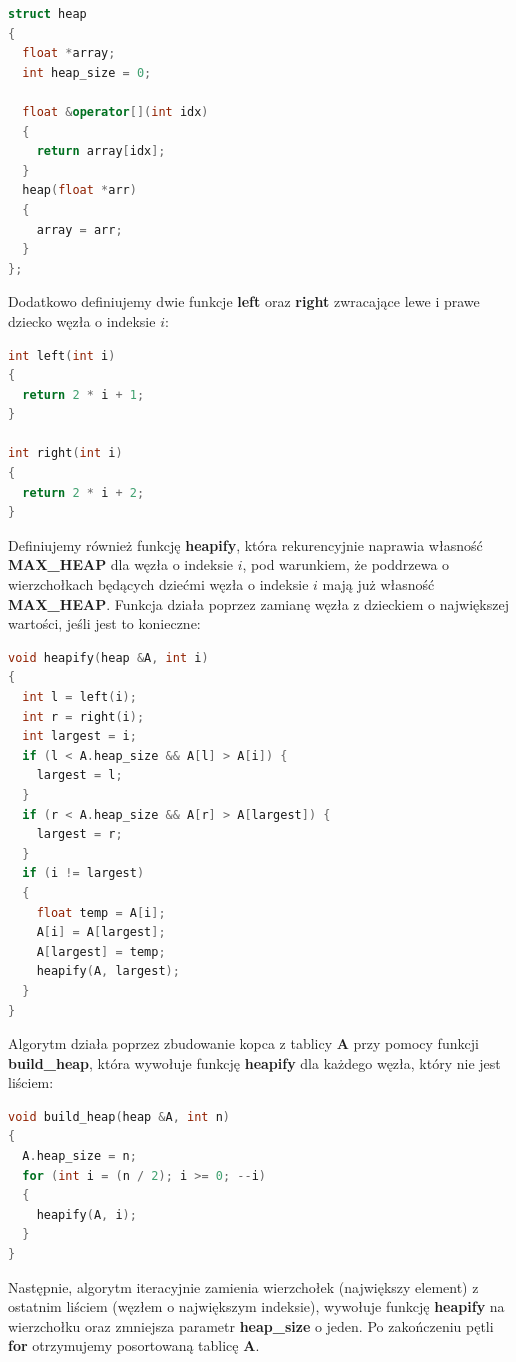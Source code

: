 \documentclass{article}
\begin{document}
\begin{lstlisting}[style=mystyle, language=C++, caption={Implementacja Heap}, label={lst:heap}]
struct heap
{
  float *array;
  int heap_size = 0;

  float &operator[](int idx)
  {
    return array[idx];
  }
  heap(float *arr)
  {
    array = arr;
  }
};
\end{lstlisting}
Dodatkowo definiujemy dwie funkcje \textbf{left} oraz \textbf{right} zwracające lewe i prawe dziecko węzła o indeksie \( i \):
\begin{lstlisting}[style=mystyle, language=C++, caption={Implementacja Left i Right}, label={lst:lr}]
int left(int i)
{
  return 2 * i + 1;
}

int right(int i)
{
  return 2 * i + 2;
}
\end{lstlisting}
Definiujemy również funkcję \textbf{heapify}, która rekurencyjnie naprawia własność \textbf{MAX\_HEAP} dla węzła o indeksie \( i \), pod warunkiem, że poddrzewa o wierzchołkach będących dziećmi węzła o indeksie \( i \) mają już własność \textbf{MAX\_HEAP}. Funkcja działa poprzez zamianę węzła z dzieckiem o największej wartości, jeśli jest to konieczne:
\begin{lstlisting}[style=mystyle, language=C++, caption={Implementacja Heapify}, label={lst:heapify}]
void heapify(heap &A, int i)
{
  int l = left(i);
  int r = right(i);
  int largest = i;
  if (l < A.heap_size && A[l] > A[i]) {
    largest = l;
  }
  if (r < A.heap_size && A[r] > A[largest]) {
    largest = r;
  }
  if (i != largest)
  {
    float temp = A[i];
    A[i] = A[largest];
    A[largest] = temp;
    heapify(A, largest);
  }
}
\end{lstlisting}
Algorytm działa poprzez zbudowanie kopca z tablicy \textbf{A} przy pomocy funkcji \textbf{build\_heap}, która wywołuje funkcję \textbf{heapify} dla każdego węzła, który nie jest liściem:

\begin{lstlisting}[style=mystyle, language=C++, caption={Implementacja Build Heap}, label={lst:buildheap}]
void build_heap(heap &A, int n)
{
  A.heap_size = n;
  for (int i = (n / 2); i >= 0; --i)
  {
    heapify(A, i);
  }
}
\end{lstlisting}

Następnie, algorytm iteracyjnie zamienia wierzchołek (największy element) z ostatnim liściem (węzłem o największym indeksie), wywołuje funkcję \textbf{heapify} na wierzchołku oraz zmniejsza parametr \textbf{heap\_size} o jeden. Po zakończeniu pętli \textbf{for} otrzymujemy posortowaną tablicę \textbf{A}.
\end{document}
